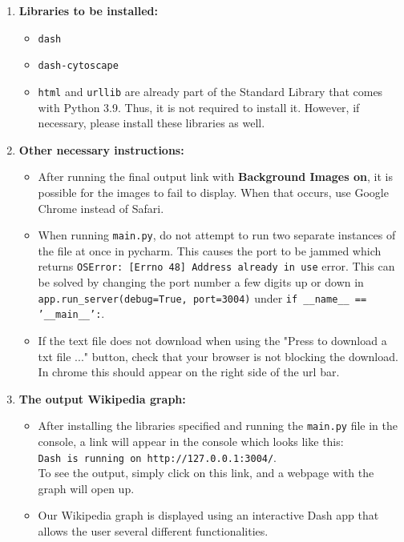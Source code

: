 \documentclass[fontsize=11pt]{article}
\begin{document}
\begin{enumerate}
    \item \textbf{Libraries to be installed:}
    \begin{itemize}
        \item \texttt{dash}
        \item \texttt{dash-cytoscape}
        \item \texttt{html} and \texttt{urllib} are already part of the Standard Library that comes with Python 3.9. Thus, it is not required to install it. However, if necessary, please install these libraries as well.
    \end{itemize}
    
    \item \textbf{Other necessary instructions:}
    \begin{itemize}
        \item After running the final output link with \textbf{Background Images on}, it is possible for the images to fail to display. When that occurs, use Google Chrome instead of Safari.
        \item When running \texttt{main.py}, do not attempt to run two separate instances of the file at once in pycharm. This causes the port to be jammed which returns \texttt{OSError: [Errno 48] Address already in use} error. This can be solved by changing the port number a few digits up or down in \texttt{app.run\_server(debug=True, port=3004)} under \texttt{if \_\_name\_\_ == '\_\_main\_\_':}.
        \item If the text file does not download when using the "Press to download a txt file ..." button, check that your browser is not blocking the download. In chrome this should appear on the right side of the url bar.
    \end{itemize}
    
    
    \item \textbf{The output Wikipedia graph: }
    
    \begin{itemize}
        \item After installing the libraries specified and running the \texttt{main.py} file in the console, a link will appear in the console which looks like this: \\ \texttt{Dash is running on http://127.0.0.1:3004/}. 
        \\ To see the output, simply click on this link, and a webpage with the graph will open up.
        
        \item Our Wikipedia graph is displayed using an interactive Dash app that allows the user several different functionalities.
        

\end{itemize}
\end{enumerate}
\end{document}
